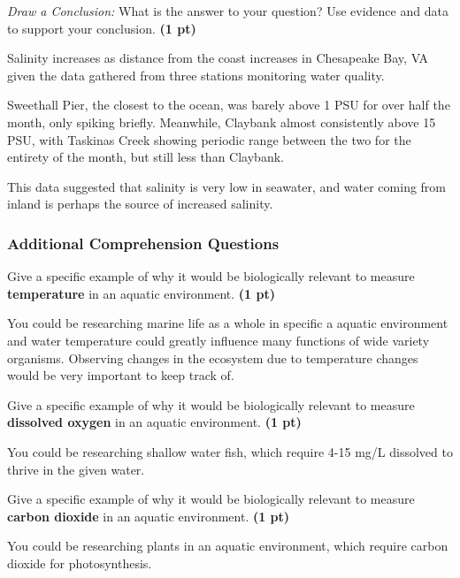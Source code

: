 \documentclass[12pt,letterpaper]{article}
\begin{document}
\begin{enumerate}[font=\bfseries, wide, resume]
    \newpage
    {\color{under}\item \textit{Draw a Conclusion:} What is the answer to your question? Use evidence and data to support your conclusion. \textbf{(1 pt)}}
    
    Salinity increases as distance from the coast increases in Chesapeake Bay, VA given the data gathered from three stations monitoring water quality. 
    
    Sweethall Pier, the closest to the ocean, was barely above 1 PSU for over half the month, only spiking briefly. Meanwhile, Claybank almost consistently above 15 PSU, with Taskinas Creek showing periodic range between the two for the entirety of the month, but still less than Claybank. 

    This data suggested that salinity is very low in seawater, and water coming from inland is perhaps the source of increased salinity. 
    
    \subsubsection*{Additional Comprehension Questions}
    {\color{under}\item Give a specific example of why it would be biologically relevant to measure \textbf{temperature} in an aquatic environment. \textbf{(1 pt)}}

    You could be researching marine life as a whole in specific a aquatic environment and water temperature could greatly influence many functions of wide variety organisms. Observing changes in the ecosystem due to temperature changes would be very important to keep track of. 

    {\color{under}\item Give a specific example of why it would be biologically relevant to measure \textbf{dissolved oxygen} in an aquatic environment. \textbf{(1 pt)}}

    You could be researching shallow water fish, which require 4-15 mg/L dissolved  to thrive in the given water. 

    {\color{under}\item Give a specific example of why it would be biologically relevant to measure \textbf{carbon dioxide} in an aquatic environment. \textbf{(1 pt)}}

    You could be researching plants in an aquatic environment, which require carbon dioxide for photosynthesis. 
\end{enumerate}
\end{document}
